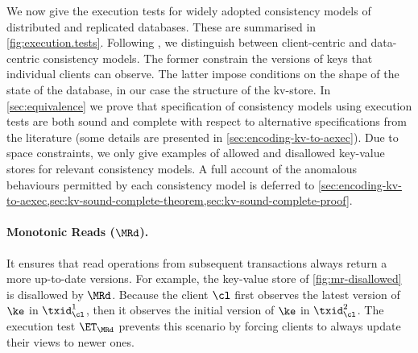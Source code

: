 We now give the execution tests for widely adopted consistency models of distributed and replicated databases. 
These are summarised in \cref{fig:execution.tests}.
Following \cite{distrprinciples}, we distinguish between client-centric and data-centric consistency models. 
The former constrain the versions of keys that individual clients can observe. 
The latter impose conditions on the shape of the state of the database, in our case the structure of the kv-store.
In \cref{sec:equivalence} we prove that specification of consistency models using execution tests
are both sound and complete with respect to alternative specifications from the literature (some details are presented in \cref{sec:encoding-kv-to-aexec}).
Due to space constraints, we only give examples of allowed and disallowed key-value stores for relevant consistency models. 
A full account of the anomalous behaviours permitted by each consistency model is deferred to \cref{sec:encoding-kv-to-aexec,sec:kv-sound-complete-theorem,sec:kv-sound-complete-proof}.

\paragraph{Monotonic Reads ($\MRd$).}
It ensures that read operations from subsequent transactions always return a more up-to-date versions.
For example, the key-value store of \cref{fig:mr-disallowed} is disallowed by $\MRd$.
Because the client $\cl$ first observes the latest version of $\ke$ in $\txid_{\cl}^{1}$,
then it observes the initial version of $\ke$ in $\txid_{\cl}^{2}$.
The execution test $\ET_{\MRd}$ prevents this scenario by forcing clients to always update their views to newer ones. 

